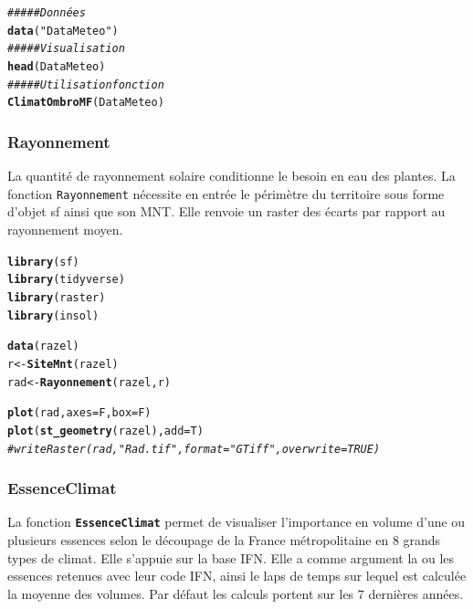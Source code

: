 \documentclass{article}\usepackage[]{graphicx}\usepackage[]{color}
\makeatletter
\newcommand{\hlstr}[1]{\textcolor[rgb]{0.192,0.494,0.8}{#1}}%
\newcommand{\hlcom}[1]{\textcolor[rgb]{0.678,0.584,0.686}{\textit{#1}}}%
\newcommand{\hlstd}[1]{\textcolor[rgb]{0.345,0.345,0.345}{#1}}%
\newcommand{\hlkwb}[1]{\textcolor[rgb]{0.69,0.353,0.396}{#1}}%
\newcommand{\hlkwc}[1]{\textcolor[rgb]{0.333,0.667,0.333}{#1}}%
\newcommand{\hlkwd}[1]{\textcolor[rgb]{0.737,0.353,0.396}{\textbf{#1}}}%
\newenvironment{kframe}{%
 \def\at@end@of@kframe{}%
 \ifinner\ifhmode%
  \def\at@end@of@kframe{\end{minipage}}%
  \begin{minipage}{\columnwidth}%
 \fi\fi%
 \def\FrameCommand##1{\hskip\@totalleftmargin \hskip-\fboxsep
 \colorbox{shadecolor}{##1}\hskip-\fboxsep
     \hskip-\linewidth \hskip-\@totalleftmargin \hskip\columnwidth}%
 \MakeFramed {\advance\hsize-\width
   \@totalleftmargin\z@ \linewidth\hsize
   \@setminipage}}%
 {\par\unskip\endMakeFramed%
 \at@end@of@kframe}
\newenvironment{knitrout}{}{} %
\makeatother
\begin{document}
\begin{knitrout}\small
{}\color{fgcolor}\begin{kframe}
\begin{alltt}
\hlcom{##### Données}
\hlkwd{data}\hlstd{(}\hlstr{"DataMeteo"}\hlstd{)}
\hlcom{##### Visualisation}
\hlkwd{head}\hlstd{(DataMeteo)}
\hlcom{##### Utilisation fonction}
\hlkwd{ClimatOmbroMF}\hlstd{(DataMeteo)}
\end{alltt}
\end{kframe}
\end{knitrout}


\subsubsection{Rayonnement}
La quantité de rayonnement solaire conditionne le besoin en eau des plantes. La fonction \texttt{Rayonnement} nécessite en entrée le périmètre du territoire sous forme d'objet sf ainsi que son MNT. Elle renvoie un raster des écarts par rapport au rayonnement moyen.

\begin{knitrout}\small
{}\color{fgcolor}\begin{kframe}
\begin{alltt}
\hlkwd{library}\hlstd{(sf)}
\hlkwd{library}\hlstd{(tidyverse)}
\hlkwd{library}\hlstd{(raster)}
\hlkwd{library}\hlstd{(insol)}

\hlkwd{data}\hlstd{(razel)}
\hlstd{r} \hlkwb{<-} \hlkwd{SiteMnt}\hlstd{(razel)}
\hlstd{rad} \hlkwb{<-} \hlkwd{Rayonnement}\hlstd{(razel, r)}

\hlkwd{plot}\hlstd{(rad,} \hlkwc{axes}\hlstd{=F,} \hlkwc{box}\hlstd{=F)}
\hlkwd{plot}\hlstd{(}\hlkwd{st_geometry}\hlstd{(razel),} \hlkwc{add}\hlstd{=T)}
\hlcom{# writeRaster(rad, "Rad.tif", format="GTiff", overwrite=TRUE)}
\end{alltt}
\end{kframe}
\end{knitrout}

\subsubsection{EssenceClimat}
La fonction \textbf{\texttt{EssenceClimat}} permet de visualiser l'importance en volume d'une ou plusieurs essences selon le découpage de la France métropolitaine en 8 grands types de climat. Elle s'appuie sur la base IFN. Elle a comme argument la ou les essences retenues avec leur code IFN, ainsi le laps de temps sur lequel est calculée la moyenne des volumes. Par défaut les calculs portent sur les 7 dernières années.
\end{document}
